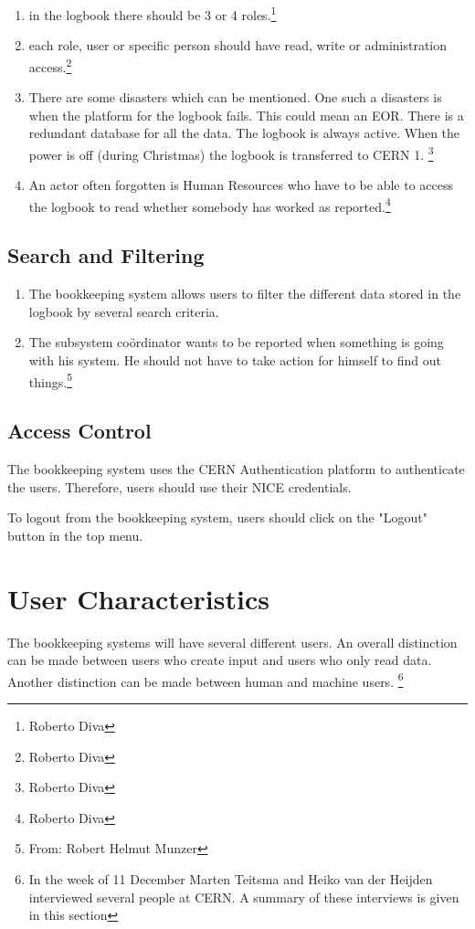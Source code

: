 \begin{enumerate}
  \item in the logbook there should be 3 or 4 roles.\footnote{Roberto Diva}
  \item each role, user or specific person should have read, write or administration access.\footnote{Roberto Diva}
  \item There are some disasters which can be mentioned. One such a disasters is when the platform for the logbook fails. This could mean an EOR. There is a redundant database for all the data. The logbook is always active. When the power is off (during Christmas) the logbook is transferred to CERN 1. \footnote{Roberto Diva}
  \item An actor often forgotten is Human Resources who have to be able to access the logbook to read whether somebody has worked as reported.\footnote{Roberto Diva}


\end{enumerate}
\subsection{Search and Filtering}
\begin{enumerate}
  \item The bookkeeping system allows users to filter the different data stored in the logbook by several search criteria.
  \item The subsystem co\"ordinator wants to be reported when something is going with his system. He should not have to take action for himself to find out things.\footnote{From: Robert Helmut Munzer}
\end{enumerate}
\subsection{Access Control}
The bookkeeping system uses the CERN Authentication platform to authenticate the users. Therefore, users should use their NICE credentials.

To logout from the bookkeeping system, users should click on the "Logout" button in the top menu.



\section{User Characteristics}
The bookkeeping systems will have several different users. An overall distinction can be made between users who create input and users who only read data. Another distinction can be made between human and machine users. \footnote{In the week of 11 December Marten Teitsma and Heiko van der Heijden interviewed several people at CERN. A summary of these interviews is given in this section}

